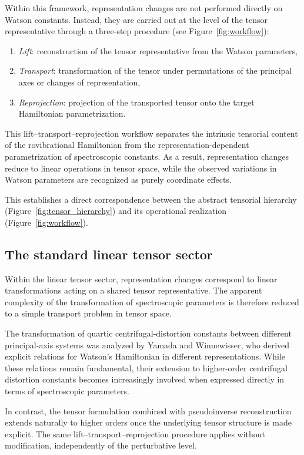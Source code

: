 \documentclass[aip,jcp,reprint,floatfix]{revtex4-2}
\begin{document}
Within this framework, representation changes are not performed
directly on Watson constants. Instead, they are carried out at the
level of the tensor representative through a three-step procedure
(see Figure~\ref{fig:workflow}):
\begin{enumerate}
\item \emph{Lift}: reconstruction of the tensor representative from the Watson parameters,
\item \emph{Transport}: transformation of the tensor under permutations of the principal axes or changes of representation,
\item \emph{Reprojection}: projection of the transported tensor onto the target Hamiltonian parametrization.
\end{enumerate}

This lift--transport--reprojection workflow separates the intrinsic
tensorial content of the rovibrational Hamiltonian from the
representation-dependent parametrization of spectroscopic constants.
As a result, representation changes reduce to linear operations in
tensor space, while the observed variations in Watson parameters are
recognized as purely coordinate effects.

This establishes a direct correspondence between the abstract tensorial
hierarchy (Figure~\ref{fig:tensor_hierarchy}) and its operational realization
(Figure~\ref{fig:workflow}).


\subsection{The standard linear tensor sector}

Within the linear tensor sector, representation changes correspond to
linear transformations acting on a shared tensor representative. The
apparent complexity of the transformation of spectroscopic parameters
is therefore reduced to a simple transport problem in tensor space.

The transformation of quartic centrifugal-distortion constants between
different principal-axis systems was analyzed by Yamada and
Winnewisser,\cite{Yamada1976} who derived explicit relations for
Watson's Hamiltonian in different representations. While these
relations remain fundamental, their extension to higher-order
centrifugal distortion constants becomes increasingly involved when
expressed directly in terms of spectroscopic parameters.

In contrast, the tensor formulation combined with pseudoinverse
reconstruction extends naturally to higher orders once the underlying
tensor structure is made explicit. The same lift--transport--reprojection
procedure applies without modification, independently of the
perturbative level.
\end{document}
